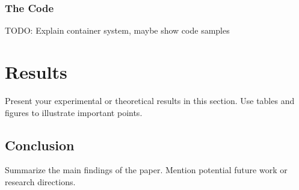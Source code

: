 \documentclass[a4paper,12pt]{report}
\begin{document}
\subsection{The Code}
TODO: Explain container system, maybe show code samples

\chapter{Results}
Present your experimental or theoretical results in this section. Use tables and figures to illustrate important points.

\section{Conclusion}
Summarize the main findings of the paper. Mention potential future work or research directions.

\nocite{*}
\printbibliography
\end{document}
